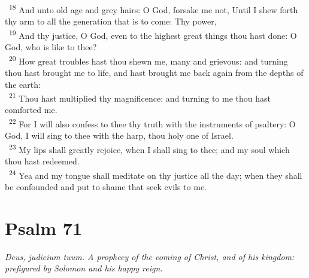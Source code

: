 \documentclass[a5paper,12pt]{article}
\begin{document}
\begin{multicols*}{2}
~\textsuperscript{18} And unto old age and grey hairs: O God, forsake me not, Until I shew forth thy arm to all the generation that is to come: Thy power,\\
~\textsuperscript{19} And thy justice, O God, even to the highest great things thou hast done: O God, who is like to thee?\\
~\textsuperscript{20} How great troubles hast thou shewn me, many and grievous: and turning thou hast brought me to life, and hast brought me back again from the depths of the earth:\\
~\textsuperscript{21} Thou hast multiplied thy magnificence; and turning to me thou hast comforted me.\\
~\textsuperscript{22} For I will also confess to thee thy truth with the instruments of psaltery: O God, I will sing to thee with the harp, thou holy one of Israel.\\
~\textsuperscript{23} My lips shall greatly rejoice, when I shall sing to thee; and my soul which thou hast redeemed.\\
~\textsuperscript{24} Yea and my tongue shall meditate on thy justice all the day; when they shall be confounded and put to shame that seek evils to me.\\

\section{Psalm 71}
\label{sec:org072cad8}
\emph{Deus, judicium tuum. A prophecy of the coming of Christ, and of his kingdom: prefigured by Solomon and his happy reign.}\\


\end{multicols*}
\end{document}
